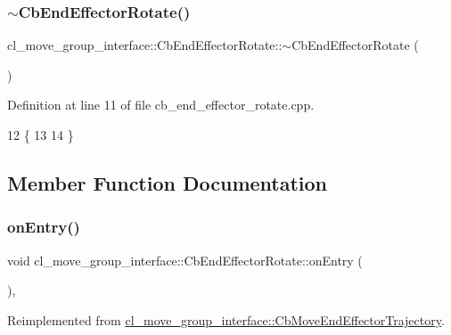 \subsubsection{\texorpdfstring{$\sim$\+Cb\+End\+Effector\+Rotate()}{~CbEndEffectorRotate()}}
{\footnotesize\ttfamily cl\+\_\+move\+\_\+group\+\_\+interface\+::\+Cb\+End\+Effector\+Rotate\+::$\sim$\+Cb\+End\+Effector\+Rotate (\begin{DoxyParamCaption}{ }\end{DoxyParamCaption})\hspace{0.3cm}{\ttfamily [virtual]}}



Definition at line 11 of file cb\+\_\+end\+\_\+effector\+\_\+rotate.\+cpp.


\begin{DoxyCode}
12     \{
13 
14     \}
\end{DoxyCode}


\subsection{Member Function Documentation}
\mbox{\label{classcl__move__group__interface_1_1CbEndEffectorRotate_a3e60bfba48906696587d66af89f7ee2b}} 
\subsubsection{\texorpdfstring{on\+Entry()}{onEntry()}}
{\footnotesize\ttfamily void cl\+\_\+move\+\_\+group\+\_\+interface\+::\+Cb\+End\+Effector\+Rotate\+::on\+Entry (\begin{DoxyParamCaption}{ }\end{DoxyParamCaption})\hspace{0.3cm}{\ttfamily [override]}, {\ttfamily [virtual]}}



Reimplemented from \hyperlink{classcl__move__group__interface_1_1CbMoveEndEffectorTrajectory_aaedd074fd178c6390a4a3f1ccff23ad3}{cl\+\_\+move\+\_\+group\+\_\+interface\+::\+Cb\+Move\+End\+Effector\+Trajectory}.



